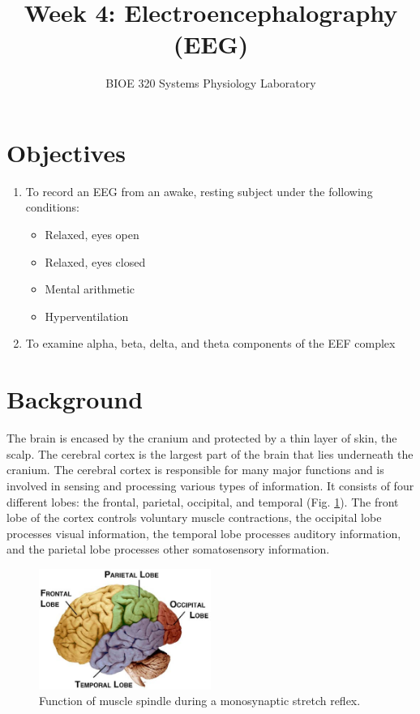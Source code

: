 \documentclass{article}
\title{Week 4: Electroencephalography (EEG)}
\author{BIOE 320 Systems Physiology Laboratory}
\date{}
\begin{document}
\large
\maketitle

\section*{Objectives}
\begin{enumerate}
	\item To record an EEG from an awake, resting subject under the following conditions:
	\begin{itemize}
		\item Relaxed, eyes open
		\item Relaxed, eyes closed
		\item Mental arithmetic
		\item Hyperventilation
	\end{itemize}
	\item To examine alpha, beta, delta, and theta components of the EEF complex
\end{enumerate}

\section*{Background}
The brain is encased by the cranium and protected by a thin layer of skin, the scalp. The cerebral cortex is the largest part of the brain that lies underneath the cranium. The cerebral cortex is responsible for many major functions and is involved in sensing and processing various types of information. It consists of four different lobes: the frontal, parietal, occipital, and temporal (Fig. \ref{brain}). The front lobe of the cortex controls voluntary muscle contractions, the occipital lobe processes visual information, the temporal lobe processes auditory information, and the parietal lobe processes other somatosensory information.

\begin{figure}[h]
\centering
\includegraphics[width=0.5\textwidth]{../images/EEG_1.jpg}	
\caption{Function of muscle spindle during a monosynaptic stretch reflex.}
\label{brain}
\end{figure}
\end{document}
